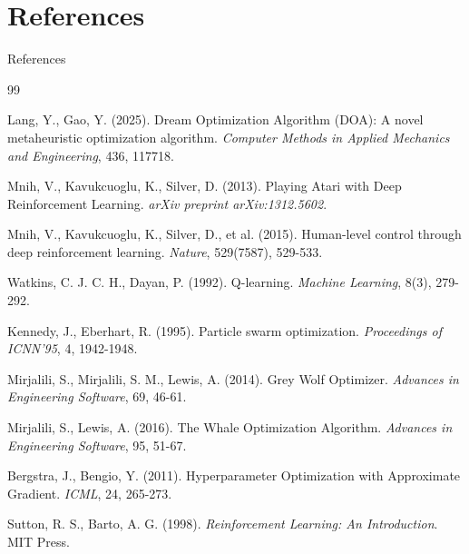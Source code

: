 \documentclass[aspectratio=169,11pt]{beamer}
\begin{document}

\section{References}

\begin{frame}{\small References}
	\begin{thebibliography}{99}
		
		 Lang, Y., Gao, Y. (2025). Dream Optimization Algorithm (DOA): A novel metaheuristic optimization algorithm. \textit{Computer Methods in Applied Mechanics and Engineering}, 436, 117718.
		
		 Mnih, V., Kavukcuoglu, K., Silver, D. (2013). Playing Atari with Deep Reinforcement Learning. \textit{arXiv preprint arXiv:1312.5602}.
		
		 Mnih, V., Kavukcuoglu, K., Silver, D., et al. (2015). Human-level control through deep reinforcement learning. \textit{Nature}, 529(7587), 529-533.
		
		 Watkins, C. J. C. H., Dayan, P. (1992). Q-learning. \textit{Machine Learning}, 8(3), 279-292.
		
		 Kennedy, J., Eberhart, R. (1995). Particle swarm optimization. \textit{Proceedings of ICNN'95}, 4, 1942-1948.
		
		 Mirjalili, S., Mirjalili, S. M., Lewis, A. (2014). Grey Wolf Optimizer. \textit{Advances in Engineering Software}, 69, 46-61.
		
		 Mirjalili, S., Lewis, A. (2016). The Whale Optimization Algorithm. \textit{Advances in Engineering Software}, 95, 51-67.
		
		 Bergstra, J., Bengio, Y. (2011). Hyperparameter Optimization with Approximate Gradient. \textit{ICML}, 24, 265-273.
		
		 Sutton, R. S., Barto, A. G. (1998). \textit{Reinforcement Learning: An Introduction}. MIT Press.
		
	\end{thebibliography}
\end{frame}
\end{document}
